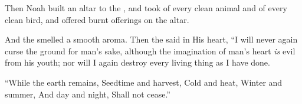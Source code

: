 
\bverse Then Noah built an altar to the \lord, and took of every clean animal and of every clean bird, and offered burnt offerings on the altar.

\bverse And the \lord smelled a smooth aroma. Then the \lord said in His heart, ``I will never again curse the ground for man's sake, although the imagination of man's heart \textit{is} evil from his youth; nor will I again destroy every living thing as I have done.

\begin{bquotation}
\bverse ``While the earth remains, Seedtime and harvest, Cold and heat, Winter and summer, And day and night, Shall not cease.''
\end{bquotation}
